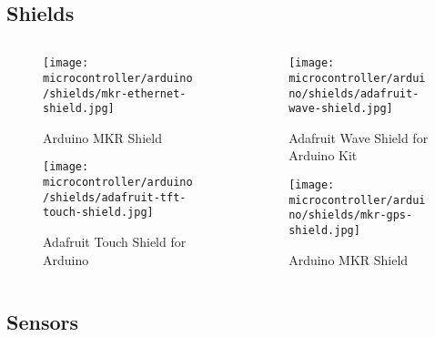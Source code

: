 \documentclass[aspectratio=169]{beamer}
\begin{document}
\subsection{Shields}
\begin{frame}
    \begin{columns}
        \begin{column}{0.5\textwidth}
            \begin{figure}
                \texttt{[image: microcontroller/arduino/shields/mkr-ethernet-shield.jpg]}
                \caption{Arduino\textregistered{} MKR  Shield}
            \end{figure}
            \begin{figure}
                \texttt{[image: microcontroller/arduino/shields/adafruit-tft-touch-shield.jpg]}
                \caption{Adafruit  Touch Shield for Arduino\textregistered{}}
            \end{figure}
        \end{column}
        \begin{column}{0.5\textwidth}
            \begin{figure}
                \texttt{[image: microcontroller/arduino/shields/adafruit-wave-shield.jpg]}
                \caption{Adafruit Wave Shield for Arduino\textregistered{} Kit}
            \end{figure}
            \begin{figure}
                \texttt{[image: microcontroller/arduino/shields/mkr-gps-shield.jpg]}
                \caption{Arduino\textregistered{} MKR  Shield}
            \end{figure}
        \end{column}
    \end{columns}
\end{frame}

\subsection{Sensors}
\end{document}
